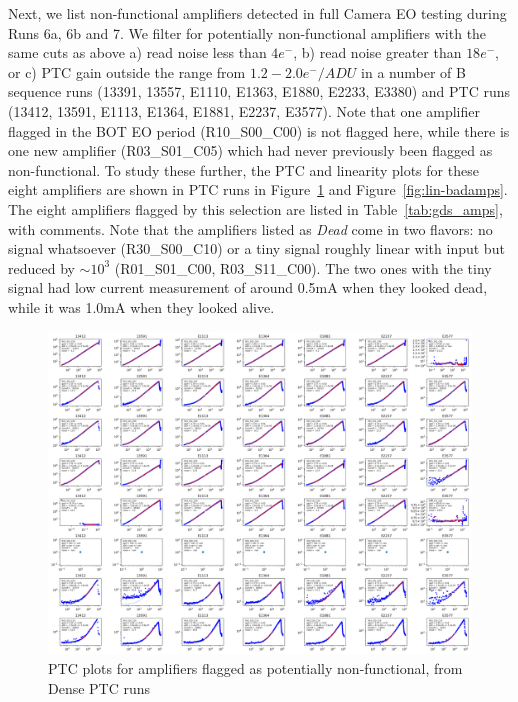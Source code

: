Next, we list non-functional amplifiers detected in full Camera EO testing during Runs 6a, 6b and 7. We filter for potentially non-functional amplifiers with the same cuts as above a) read noise less than $4e^{-}$, b) read noise greater than $18e^{-}$, or c) PTC gain outside the range from $1.2 - 2.0 e^{-}/ADU$ in a number of B sequence runs (13391, 13557, E1110, E1363, E1880, E2233, E3380) and PTC runs (13412, 13591, E1113, E1364, E1881, E2237, E3577).  Note that one amplifier flagged in the BOT EO period (R10\_S00\_C00) is not flagged here, while there is one new amplifier (R03\_S01\_C05) which had never previously been flagged as non-functional.  To study these further, the PTC and linearity plots for these eight amplifiers are shown in PTC runs in Figure~\ref{fig:ptc-badamps} and Figure~\ref{fig:lin-badamps}. The eight amplifiers flagged by this selection are listed in Table~\ref{tab:gds_amps}, with comments.  Note that the amplifiers listed as {\it Dead} come in two flavors: no signal whatsoever (R30\_S00\_C10) or a tiny signal roughly linear with input but reduced by $\sim10^3$ (R01\_S01\_C00, R03\_S11\_C00). The two ones with the tiny signal had low current measurement of around 0.5mA when they looked dead, while it was 1.0mA when they looked alive. 

\begin{figure}[ht]
    \centering
    \includegraphics[width=0.95\linewidth]{figures/ptc_badamps.png}
    \caption{PTC plots for amplifiers flagged as potentially non-functional, from Dense PTC runs}
    \label{fig:ptc-badamps}
\end{figure}

